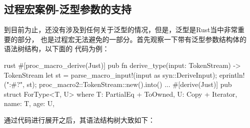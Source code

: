 \subsection{过程宏案例-泛型参数的支持}
到目前为止，还没有涉及到任何关于泛型的情况，但是，泛型是Rust当中非常重要的部分，
也是过程宏无法避免的一部分。首先观察一下带有泛型参数结构体的语法树结构，以下面的
代码为例：
\begin{code-block}{rust}
#[proc_macro_derive(Just)]
pub fn derive_type(input: TokenStream) -> TokenStream {
    let st = parse_macro_input!(input as syn::DeriveInput);
    eprintln!("{:#?}", st);
    proc_macro2::TokenStream::new().into()
}
...
#[derive(Just)]
pub struct ForType<T, U>
where
    T: PartialEq + ToOwned,
    U: Copy + Iterator,
{
    name: T,
    age: U,
}
\end{code-block}
通过代码进行展开之后，其语法结构树大致如下：
